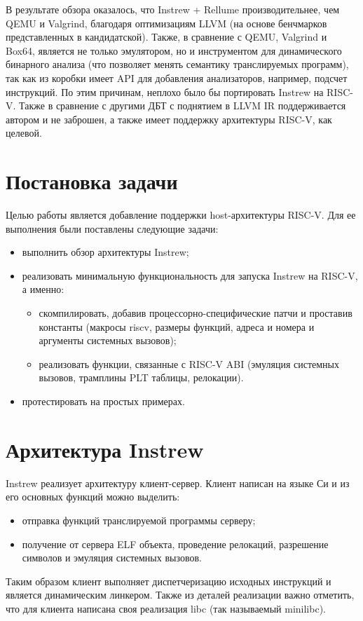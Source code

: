 В результате обзора оказалось, что Instrew + Rellume производительнее, чем QEMU и Valgrind, благодаря оптимизациям LLVM (на основе бенчмарков представленных в кандидатской). Также, в сравнение с QEMU, Valgrind и Box64, является не только эмулятором, но и инструментом для динамического бинарного анализа (что позволяет менять семантику транслируемых программ), так как из коробки имеет API для добавления анализаторов, например, подсчет инструкций. По этим причинам, неплохо было бы портировать Instrew на RISC-V.
Также в сравнение с другими ДБТ с поднятием в LLVM IR поддерживается автором и не заброшен, а также имеет поддержку архитектуры RISC-V, как целевой.

\section{Постановка задачи}
Целью работы является добавление поддержки host-архитектуры RISC-V. Для ее выполнения были поставлены следующие задачи:
\begin{itemize}
    \item выполнить обзор архитектуры Instrew;
    \item реализовать минимальную функциональность для запуска Instrew на RISC-V, а именно:
          \begin{itemize}
              \item скомпилировать, добавив процессорно-специфические патчи и проставив константы (макросы riscv, размеры функций, адреса и номера и аргументы системных вызовов);
              \item реализовать функции, связанные с RISC-V ABI (эмуляция системных вызовов, трамплины PLT таблицы, релокации).
          \end{itemize}
    \item протестировать на простых примерах.
\end{itemize}

\section{Архитектура Instrew}
Instrew реализует архитектуру клиент-сервер. Клиент написан на языке Си и из его основных функций можно выделить:
\begin{itemize}
    \item отправка функций транслируемой программы серверу;
    \item получение от сервера ELF объекта, проведение релокаций, разрешение символов и эмуляция системных вызовов.
\end{itemize}
Таким образом клиент выполняет диспетчеризацию исходных инструкций и является динамическим линкером. Также из деталей реализации важно отметить, что для клиента написана своя реализация libc (так называемый minilibc).

